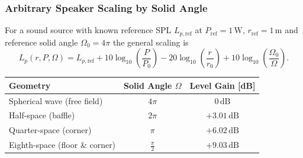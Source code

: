 \subsubsection{Arbitrary Speaker Scaling by Solid Angle}
For a sound source with known reference SPL $L_{p,\mathrm{ref}}$ at $P_{\mathrm{ref}}=1\,\mathrm{W}$, $r_{\mathrm{ref}}=1\,$m and reference solid angle $\Omega_0=4\pi$ the general scaling is
\[
L_p(r,P,\Omega)=L_{p,\mathrm{ref}}+10\log_{10}\left(\frac{P}{P_0}\right)-20\log_{10}\left(\frac{r}{r_0}\right)+10\log_{10}\left(\frac{\Omega_0}{\Omega}\right).
\]

\begin{center}  %
\begin{tabular}{lcc}
\toprule
Geometry & Solid Angle $\Omega$ & Level Gain [dB] \\
\midrule
Spherical wave (free field)       & $4\pi$          & $0\,\mathrm{dB}$  \\
Half-space (baffle)               & $2\pi$          & $+3.01\,\mathrm{dB}$ \\
Quarter-space (corner)            & $\pi$           & $+6.02\,\mathrm{dB}$ \\
Eighth-space (floor \& corner)   & $\frac{\pi}{2}$ & $+9.03\,\mathrm{dB}$ \\
\bottomrule
\end{tabular}
\end{center}


\newpage





